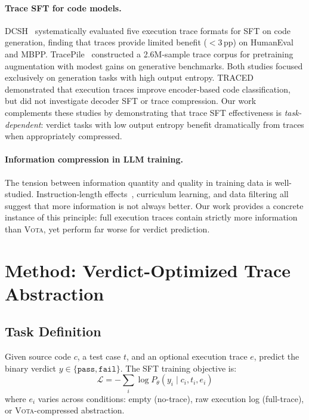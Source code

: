 \documentclass[11pt,a4paper]{article}
\newcommand{\vota}{\textsc{Vota}}
\begin{document}
\paragraph{Trace SFT for code models.}
DCSH~\cite{dcsh2025} systematically evaluated five execution trace formats for SFT on code generation, finding that traces provide limited benefit ($<$3\,pp) on HumanEval and MBPP.
TracePile~\cite{tracepile2025} constructed a 2.6M-sample trace corpus for pretraining augmentation with modest gains on generative benchmarks.
Both studies focused exclusively on generation tasks with high output entropy.
TRACED~\cite{traced2024} demonstrated that execution traces improve encoder-based code classification, but did not investigate decoder SFT or trace compression.
Our work complements these studies by demonstrating that trace SFT effectiveness is \emph{task-dependent}: verdict tasks with low output entropy benefit dramatically from traces when appropriately compressed.

\paragraph{Information compression in LLM training.}
The tension between information quantity and quality in training data is well-studied.
Instruction-length effects~\cite{instruction_length}, curriculum learning, and data filtering all suggest that more information is not always better.
Our work provides a concrete instance of this principle: full execution traces contain strictly more information than \vota{}, yet perform far worse for verdict prediction.

\section{Method: Verdict-Optimized Trace Abstraction}
\label{sec:method}

\subsection{Task Definition}

Given source code $c$, a test case $t$, and an optional execution trace $e$, predict the binary verdict $y \in \{\texttt{pass}, \texttt{fail}\}$.
The SFT training objective is:
\begin{equation}
\mathcal{L} = -\sum_{i} \log P_\theta(y_i \mid c_i, t_i, e_i)
\end{equation}
where $e_i$ varies across conditions: empty (no-trace), raw execution log (full-trace), or \vota{}-compressed abstraction.
\end{document}
